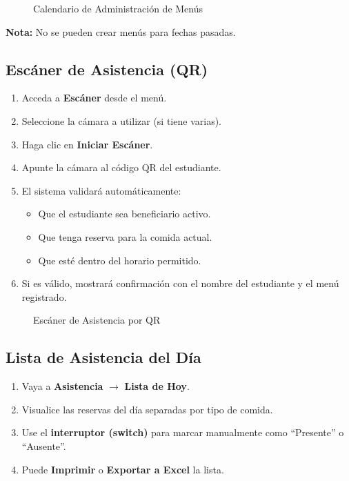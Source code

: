 \documentclass[12pt,a4paper]{article}
\begin{document}
\begin{figure}[h]
    \centering
    \caption{Calendario de Administración de Menús}
    \label{fig:calendario_menus}
\end{figure}

\textbf{Nota:} No se pueden crear menús para fechas pasadas.

\subsection{Escáner de Asistencia (QR)}
\begin{enumerate}
    \item Acceda a \textbf{Escáner} desde el menú.
    \item Seleccione la cámara a utilizar (si tiene varias).
    \item Haga clic en \textbf{Iniciar Escáner}.
    \item Apunte la cámara al código QR del estudiante.
    \item El sistema validará automáticamente:
    \begin{itemize}
        \item Que el estudiante sea beneficiario activo.
        \item Que tenga reserva para la comida actual.
        \item Que esté dentro del horario permitido.
    \end{itemize}
    \item Si es válido, mostrará confirmación con el nombre del estudiante y el menú registrado.
\end{enumerate}

\begin{figure}[h]
    \centering
    \caption{Escáner de Asistencia por QR}
    \label{fig:escaner}
\end{figure}

\subsection{Lista de Asistencia del Día}
\begin{enumerate}
    \item Vaya a \textbf{Asistencia} $\rightarrow$ \textbf{Lista de Hoy}.
    \item Visualice las reservas del día separadas por tipo de comida.
    \item Use el \textbf{interruptor (switch)} para marcar manualmente como ``Presente'' o ``Ausente''.
    \item Puede \textbf{Imprimir} o \textbf{Exportar a Excel} la lista.
\end{enumerate}
\end{document}

